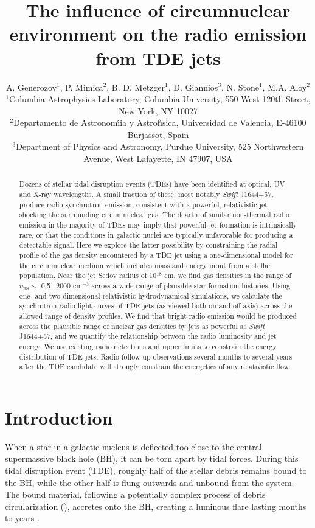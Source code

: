 \documentclass[usenatbib,fleqn]{mnras}
\title[Influence of CNM on TDE radio emission]{The influence of
  circumnuclear environment on the radio emission from TDE jets}
\author[Generozov et al.]{ A. Generozov$^{1}$, P. Mimica$^{2}$,
  B. D. Metzger$^{1}$, D. Giannios$^{3}$, N. Stone$^{1}$,
  M.A. Aloy$^{2}$
  \\
  $^{1}$Columbia Astrophysics Laboratory, Columbia University, 550 West 120th Street, New York, NY 10027\\
  $^{2}$Departamento de Astronom\'{\i}ia y Astrof\'{\i}sica, Universidad de Valencia, E-46100 Burjassot, Spain\\
  $^{3}$Department of Physics and Astronomy, Purdue University, 525
  Northwestern Avenue, West Lafayette, IN 47907, USA}
\begin{document}
\maketitle
\begin{abstract}
  Dozens of stellar tidal disruption events (TDEs) have been
  identified at optical, UV and X-ray wavelengths.  A small fraction
  of these, most notably {\it Swift} J1644+57, produce radio
  synchrotron emission, consistent with a powerful, relativistic jet
  shocking the surrounding circumnuclear gas.  The dearth of similar
  non-thermal radio emission in the majority of TDEs may imply that
  powerful jet formation is intrinsically rare, or that the conditions
  in galactic nuclei are typically unfavorable for producing a
  detectable signal.  Here we explore the latter possibility by
  constraining the radial profile of the gas density encountered by a
  TDE jet using a one-dimensional model for the circumnuclear medium
  which includes mass and energy input from a stellar population.
  Near the jet Sedov radius of 10$^{18}$ cm, we find gas densities in
  the range of $n_{18} \sim$ 0.5$-$2000 cm$^{-3}$ across a wide range
  of plausible star formation histories.  Using one- and
  two-dimensional relativistic hydrodynamical simulations, we
  calculate the synchrotron radio light curves of TDE jets (as viewed
  both on and off-axis) across the allowed range of density profiles.
  We find that bright radio emission would be produced across the
  plausible range of nuclear gas densities by jets as powerful as {\it
    Swift} J1644+57, and we quantify the relationship between the
  radio luminosity and jet energy.  We use existing radio detections
  and upper limits to constrain the energy distribution of TDE jets.
  Radio follow up observations several months to several years after the TDE
  candidate will strongly constrain the energetics of any relativistic
  flow.
\end{abstract}
\section{Introduction}
\label{sec:intro}
When a star in a galactic nucleus is deflected too close to the
central supermassive black hole (BH), it can be torn apart by tidal
forces.  During this tidal disruption event (TDE), roughly half of the
stellar debris remains bound to the BH, while the other half is flung
outwards and unbound from the system.  The bound material, following a
potentially complex process of debris circularization
(\citealt{Kochanek1994,Guillochon+2013,Hayasaki+2013,Hayasaki+2015,Shiokawa+2015,Bonnerot+2015}),
accretes onto the BH, creating a luminous flare lasting months to
years \citep{Hills1975, Carter+1982, Rees1988}.
\end{document}
